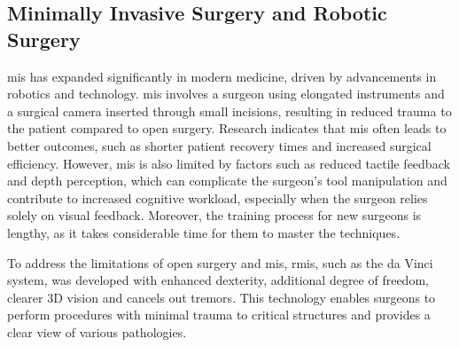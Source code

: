 \documentclass[12pt]{article}
\begin{document}
\subsection{Minimally Invasive Surgery and Robotic Surgery}
\gls{mis} has expanded significantly in modern medicine, driven by advancements in robotics and technology. \gls{mis} involves a surgeon using elongated instruments and a surgical camera inserted through small incisions, resulting in reduced trauma to the patient compared to open surgery\cite{mcafee2010minimally}\cite{allan20183}. Research indicates that \gls{mis} often leads to better outcomes, such as shorter patient recovery times and increased surgical efficiency\cite{mcafee2010minimally}. However, \gls{mis} is also limited by factors such as reduced tactile feedback and depth perception, which can complicate the surgeon’s tool manipulation and contribute to increased cognitive workload, especially when the surgeon relies solely on visual feedback\cite{allan20183}\cite{allan2017visual}. Moreover, the training process for new surgeons is lengthy, as it takes considerable time for them to master the techniques\cite{allan20183}\cite{allan2017visual}\cite{hein2021towards}.

To address the limitations of open surgery and \gls{mis}, \gls{rmis}, such as the da Vinci system, was developed with enhanced dexterity, additional degree of freedom, clearer 3D vision and cancels out tremors\cite{plerhoples2012aching}\cite{allan2017visual}\cite{allan20183}. This technology enables surgeons to perform procedures with minimal trauma to critical structures and provides a clear view of various pathologies\cite{allan2017visual}.
\end{document}
